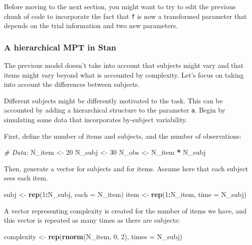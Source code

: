 \documentclass[12pt,]{krantz}
\newenvironment{Shaded}{\begin{snugshade}}{\end{snugshade}}
\newcommand{\KeywordTok}[1]{\textcolor[rgb]{0.13,0.29,0.53}{\textbf{#1}}}
\newcommand{\DataTypeTok}[1]{\textcolor[rgb]{0.13,0.29,0.53}{#1}}
\newcommand{\DecValTok}[1]{\textcolor[rgb]{0.00,0.00,0.81}{#1}}
\newcommand{\StringTok}[1]{\textcolor[rgb]{0.31,0.60,0.02}{#1}}
\newcommand{\CommentTok}[1]{\textcolor[rgb]{0.56,0.35,0.01}{\textit{#1}}}
\newcommand{\OperatorTok}[1]{\textcolor[rgb]{0.81,0.36,0.00}{\textbf{#1}}}
\newcommand{\NormalTok}[1]{#1}
\theoremstyle{definition}
\theoremstyle{definition}
\theoremstyle{definition}
\theoremstyle{remark}
\begin{document}
Before moving to the next section, you might want to try to edit the
previous chunk of code to incorporate the fact that \texttt{f} is now a
transformed parameter that depends on the trial information and two new
parameters.

\subsubsection{A hierarchical MPT in Stan}\label{sec:MPT-h}

The previous model doesn't take into account that subjects might vary
and that items might vary beyond what is accounted by complexity. Let's
focus on taking into account the differences between subjects.

Different subjects might be differently motivated to the task. This can
be accounted by adding a hierarchical structure to the parameter
\texttt{a}. Begin by simulating some data that incorporates by-subject
variability.

First, define the number of items and subjects, and the number of
observations:

\begin{Shaded}
\begin{Highlighting}[]
\CommentTok{# Data:}
\NormalTok{N_item <-}\StringTok{ }\DecValTok{20}
\NormalTok{N_subj <-}\StringTok{ }\DecValTok{30}
\NormalTok{N_obs <-}\StringTok{ }\NormalTok{N_item }\OperatorTok{*}\StringTok{ }\NormalTok{N_subj }
\end{Highlighting}
\end{Shaded}

Then, generate a vector for subjects and for items. Assume here that
each subject sees each item.

\begin{Shaded}
\begin{Highlighting}[]
\NormalTok{subj <-}\StringTok{ }\KeywordTok{rep}\NormalTok{(}\DecValTok{1}\OperatorTok{:}\NormalTok{N_subj, }\DataTypeTok{each =}\NormalTok{ N_item)}
\NormalTok{item <-}\StringTok{ }\KeywordTok{rep}\NormalTok{(}\DecValTok{1}\OperatorTok{:}\NormalTok{N_item, }\DataTypeTok{time =}\NormalTok{ N_subj)}
\end{Highlighting}
\end{Shaded}

A vector representing complexity is created for the number of items we
have, and this vector is repeated as many times as there are subjects:

\begin{Shaded}
\begin{Highlighting}[]
\NormalTok{complexity <-}\StringTok{ }\KeywordTok{rep}\NormalTok{(}\KeywordTok{rnorm}\NormalTok{(N_item, }\DecValTok{0}\NormalTok{, }\DecValTok{2}\NormalTok{), }\DataTypeTok{times =}\NormalTok{ N_subj)}
\end{Highlighting}
\end{Shaded}
\end{document}
